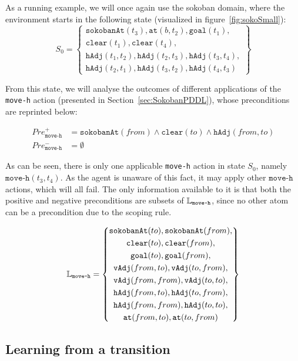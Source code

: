 \documentclass[../Master.tex]{subfiles}
\begin{document}
\begin{example}\label{ex:ncp:sokobanSetup}
    As a running example, we will once again use the sokoban domain, where the environment starts in the following state (visualized in figure~\ref{fig:sokoSmall}):
    \begin{equation*}
        S_0 =
        \left\{
            \begin{gathered}
                \texttt{sokobanAt}(t_3), \texttt{at}(b, t_2), \texttt{goal}(t_1), \\
                \texttt{clear}(t_1), \texttt{clear}(t_4), \\
                \texttt{hAdj}(t_1, t_2), \texttt{hAdj}(t_2, t_3),
                \texttt{hAdj}(t_3, t_4), \\
                \texttt{hAdj}(t_2, t_1), \texttt{hAdj}(t_3, t_2),
                \texttt{hAdj}(t_4, t_3)
            \end{gathered}
        \right\}
    \end{equation*}

    From this state, we will analyse the outcomes of different applications of the \texttt{move-h} action (presented in Section~\ref{sec:SokobanPDDL}), whose preconditions are reprinted below:

    \begin{align*}
        Pre_{\texttt{move-h}}^+ &= 
            \texttt{sokobanAt}(from) \land \texttt{clear}(to) \land \texttt{hAdj}(from, to)
             \\
        Pre_{\texttt{move-h}}^- &= \emptyset
    \end{align*}

    As can be seen, there is only one applicable \texttt{move-h} action in state $S_0$, namely $\texttt{move-h}(t_3,t_4)$. As the agent is unaware of this fact, it may apply other $\texttt{move-h}$ actions, which will all fail. The only information available to it is that both the positive and negative preconditions are subsets of $\mathbb{L}_{\texttt{move-h}}$, since no other atom can be a precondition due to the scoping rule.

    \begin{equation*}
    \mathbb{L}_{\texttt{move-h}} =
    \left\{
        \begin{gathered}
            \texttt{sokobanAt}(to), \texttt{sokobanAt}(from), \\
            \texttt{clear}(to), \texttt{clear}(from), \\
            \texttt{goal}(to), \texttt{goal}(from), \\
            \texttt{vAdj}(from, to), \texttt{vAdj}(to, from), \\
            \texttt{vAdj}(from, from), \texttt{vAdj}(to, to), \\
            \texttt{hAdj}(from, to), \texttt{hAdj}(to, from), \\
            \texttt{hAdj}(from, from), \texttt{hAdj}(to, to), \\
            \texttt{at}(from, to), \texttt{at}(to, from)
        \end{gathered}
    \right\}
    \end{equation*}
\end{example}

\subsection{Learning from a transition}

\end{document}
